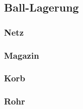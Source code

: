 \subsection{Ball-Lagerung}

\subsubsection{Netz}

\subsubsection{Magazin}

\subsubsection{Korb}

\subsubsection{Rohr}